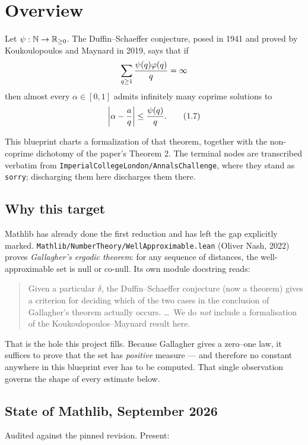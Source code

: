 \chapter{Overview}
\label{chap:overview}

Let $\psi : \mathbb{N} \to \mathbb{R}_{\geq 0}$. The Duffin--Schaeffer conjecture, posed in 1941 and
proved by Koukoulopoulos and Maynard in 2019, says that if
\[ \sum_{q \geq 1} \frac{\psi(q)\varphi(q)}{q} = \infty \]
then almost every $\alpha \in [0,1]$ admits infinitely many coprime solutions to
\[ \left| \alpha - \frac{a}{q} \right| \leq \frac{\psi(q)}{q}. \tag{1.7} \]

This blueprint charts a formalization of that theorem, together with the
non-coprime dichotomy of the paper's Theorem 2. The terminal nodes are transcribed
verbatim from \texttt{ImperialCollegeLondon/AnnalsChallenge}, where they stand as
\texttt{sorry}; discharging them here discharges them there.

\section*{Why this target}

Mathlib has already done the first reduction and has left the gap explicitly marked.
\texttt{Mathlib/NumberTheory/WellApproximable.lean} (Oliver Nash, 2022) proves
\emph{Gallagher's ergodic theorem}: for any sequence of distances, the
well-approximable set is null or co-null. Its own module docstring reads:

\begin{quote}
Given a particular $\delta$, the Duffin--Schaeffer conjecture (now a theorem) gives a
criterion for deciding which of the two cases in the conclusion of Gallagher's theorem
actually occurs. \dots\ We do \emph{not} include a formalisation of the
Koukoulopoulos--Maynard result here.
\end{quote}

That is the hole this project fills. Because Gallagher gives a zero--one law, it
suffices to prove that the set has \emph{positive} measure --- and therefore no
constant anywhere in this blueprint ever has to be computed. That single observation
governs the shape of every estimate below.

\section*{State of Mathlib, September 2026}

Audited against the pinned revision. Present:

